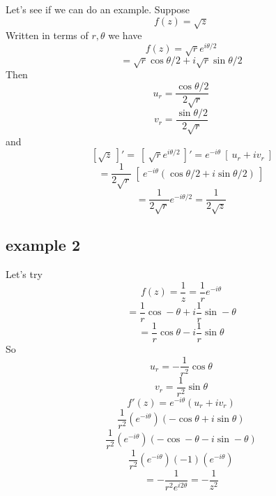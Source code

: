 \documentclass[11pt, oneside]{article}   	%
\begin{document}
Let's see if we can do an example.  Suppose
\[ f(z) = \sqrt{z} \]
Written in terms of $r, \theta$ we have
\[ f(z) = \sqrt{r} e^{i \theta/2} \]
\[ = \sqrt{r} \cos \theta/2 + i \sqrt{r} \sin \theta/2 \]
Then
\[ u_r = \frac{\cos \theta/2}{2 \sqrt{r}} \]
\[ v_r = \frac{\sin \theta/2}{2 \sqrt{r}} \]
and
\[ \ [ \sqrt{z} \ ]' = \ [ \ \sqrt{r} e^{i \theta/2} \ ]' = e^{-i \theta} \ [ \ u_r + i v_r \ ] \]
\[ = \frac{1}{2 \sqrt{r}} \ [ \ e^{-i \theta} (\cos \theta/2 + i \sin \theta/2) \ ]    \]
\[ = \frac{1}{2 \sqrt{r}} e^{-i \theta/2} = \frac{1}{2 \sqrt{z}} \]

\subsection*{example 2}
Let's try
\[ f(z) = \frac{1}{z} = \frac{1}{r} e^{-i \theta} \]
\[ = \frac{1}{r} \cos - \theta + i \frac{1}{r} \sin - \theta \]
\[ = \frac{1}{r} \cos \theta - i \frac{1}{r} \sin \theta \]
So
\[ u_r = -\frac{1}{r^2} \cos \theta \]
\[ v_r = \frac{1}{r^2} \sin \theta \]
\[ f'(z) = e^{-i \theta}  (u_r + i v_r) \]
\[ \frac{1}{r^2} ( e^{-i \theta}) (- \cos \theta + i \sin \theta) \]
\[ \frac{1}{r^2} ( e^{-i \theta}) (- \cos - \theta - i \sin - \theta) \]
\[ \frac{1}{r^2} ( e^{-i \theta}) (-1) (e^{-i \theta}) \]
\[ = -\frac{1}{r^2 e^{i 2\theta}} = -\frac{1}{z^2} \]
\end{document}
